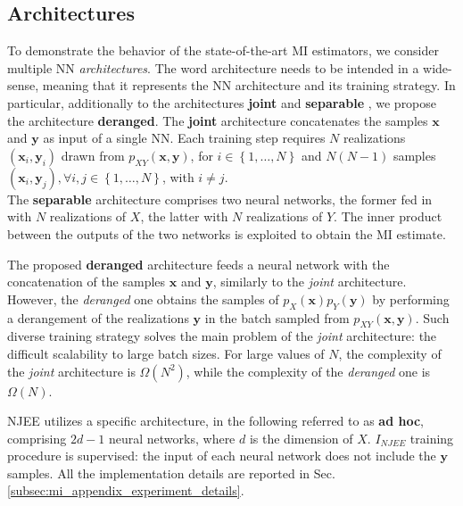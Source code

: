 \subsection{Architectures}
\label{subsec:mi_architectures}
To demonstrate the behavior of the state-of-the-art MI estimators, we consider multiple NN \textit{architectures}. The word architecture needs to be intended in a wide-sense, meaning that it represents the NN architecture and its training strategy.
In particular, additionally to the architectures \textbf{joint} \cite{Mine2018} and \textbf{separable} \cite{oord2018representation}, we propose the architecture \textbf{deranged}.
The \textbf{joint} architecture concatenates the samples $\mathbf{x}$ and $\mathbf{y}$ as input of a single NN. Each training step requires $N$ realizations $(\mathbf{x}_i, \mathbf{y}_i)$ drawn from $p_{XY}(\mathbf{x},\mathbf{y})$, for $i \in \left\{ 1, \dotsc, N \right\}$ and $N(N-1)$ samples $(\mathbf{x}_i, \mathbf{y}_j), \forall i,j \in \left\{ 1, \dotsc, N \right\}$, with $ i \neq j$.\\
The \textbf{separable} architecture comprises two neural networks, the former fed in with $N$ realizations of $X$, the latter with $N$ realizations of $Y$. The inner product between the outputs of the two networks is exploited to obtain the MI estimate.

The proposed \textbf{deranged} architecture feeds a neural network with the concatenation of the samples $\mathbf{x}$ and $\mathbf{y}$, similarly to the \textit{joint} architecture. However, the \textit{deranged} one obtains the samples of $p_X(\mathbf{x})p_Y(\mathbf{y})$ by performing a derangement of the realizations $\mathbf{y}$ in the batch sampled from $p_{XY}(\mathbf{x},\mathbf{y})$.
Such diverse training strategy solves the main problem of the \textit{joint} architecture: the difficult scalability to large batch sizes. For large values of $N$, the complexity of the \textit{joint} architecture is $\Omega(N^2)$, while the complexity of the \textit{deranged} one is $\Omega(N)$.

NJEE utilizes a specific architecture, in the following referred to as \textbf{ad hoc}, comprising $2d-1$ neural networks, where $d$ is the dimension of $X$. $I_{NJEE}$ training procedure is supervised: the input of each neural network does not include the $\mathbf{y}$ samples.
All the implementation details are reported in Sec.  \ref{subsec:mi_appendix_experiment_details}.

